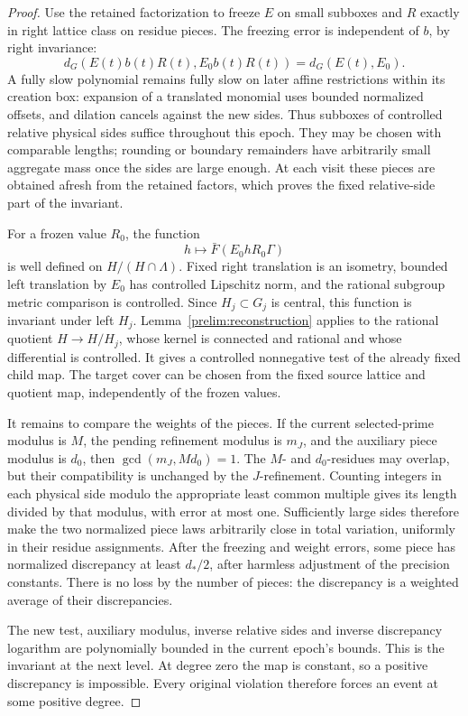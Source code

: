 \begin{proof}
Use the retained factorization to freeze $E$ on small subboxes
and $R$ exactly in right lattice class on residue pieces.  The
freezing error is independent of $b$, by right invariance:
\[
 d_G(E(t)b(t)R(t),E_0b(t)R(t))=d_G(E(t),E_0).
\]
A fully slow polynomial remains fully slow on later affine
restrictions within its creation box: expansion of a translated
monomial uses bounded normalized offsets, and dilation cancels
against the new sides.  Thus subboxes of controlled relative
physical sides suffice throughout this epoch.  They may be chosen
with comparable lengths; rounding or boundary remainders have
arbitrarily small aggregate mass once the sides are large enough.
At each visit these pieces are obtained afresh from the retained
factors, which proves the fixed relative-side part of the invariant.

For a frozen value $R_0$, the function
\[
 h\longmapsto\bar F(E_0hR_0\Gamma)
\]
is well defined on $H/(H\cap\Lambda)$.  Fixed right translation
is an isometry, bounded left translation by $E_0$ has controlled
Lipschitz norm, and the rational subgroup metric comparison is
controlled.  Since $H_j\subset G_j$ is central, this function is
invariant under left $H_j$.  Lemma~\ref{prelim:reconstruction}
applies to the rational quotient $H\to H/H_j$, whose kernel is
connected and rational and whose differential is controlled.
It gives a controlled nonnegative test of the already fixed
child map.  The target cover can be chosen from the fixed source
lattice and quotient map, independently of the frozen values.

It remains to compare the weights of the pieces.  If the current
selected-prime modulus is $M$, the pending refinement modulus is
$m_J$, and the auxiliary piece modulus is $d_0$, then
$\gcd(m_J,Md_0)=1$.  The $M$- and $d_0$-residues may overlap, but
their compatibility is unchanged by the $J$-refinement.
Counting integers in each physical side modulo the appropriate
least common multiple gives its length divided by that modulus,
with error at most one.  Sufficiently large sides therefore make
the two normalized piece laws arbitrarily close in total variation,
uniformly in their residue assignments.  After the freezing and
weight errors, some piece has normalized discrepancy at least
$d_*/2$, after harmless adjustment of the precision constants.
There is no loss by the number of pieces: the discrepancy is a
weighted average of their discrepancies.

The new test, auxiliary modulus, inverse relative sides and
inverse discrepancy logarithm are polynomially bounded in the
current epoch's bounds.  This is the invariant at the next level.
At degree zero the map is constant, so a positive discrepancy is
impossible.  Every original violation therefore forces an event
at some positive degree.


\end{proof}
